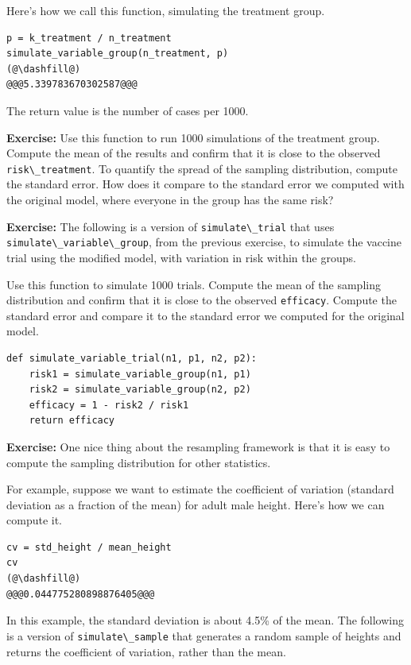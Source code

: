 Here's how we call this function, simulating the treatment group.

\begin{lstlisting}[]
p = k_treatment / n_treatment
simulate_variable_group(n_treatment, p)
(@\dashfill@)
@@@5.339783670302587@@@
\end{lstlisting}

The return value is the number of cases per 1000.

\textbf{Exercise:} Use this function to run 1000 simulations of the
treatment group. Compute the mean of the results and confirm that it is
close to the observed \passthrough{\lstinline!risk\_treatment!}. To
quantify the spread of the sampling distribution, compute the standard
error. How does it compare to the standard error we computed with the
original model, where everyone in the group has the same risk?

\textbf{Exercise:} The following is a version of
\passthrough{\lstinline!simulate\_trial!} that uses
\passthrough{\lstinline!simulate\_variable\_group!}, from the previous
exercise, to simulate the vaccine trial using the modified model, with
variation in risk within the groups.

Use this function to simulate 1000 trials. Compute the mean of the
sampling distribution and confirm that it is close to the observed
\passthrough{\lstinline!efficacy!}. Compute the standard error and
compare it to the standard error we computed for the original model.

\begin{lstlisting}[]
def simulate_variable_trial(n1, p1, n2, p2):
    risk1 = simulate_variable_group(n1, p1)
    risk2 = simulate_variable_group(n2, p2)
    efficacy = 1 - risk2 / risk1
    return efficacy
\end{lstlisting}

\textbf{Exercise:} One nice thing about the resampling framework is that
it is easy to compute the sampling distribution for other statistics.

For example, suppose we want to estimate the coefficient of variation
(standard deviation as a fraction of the mean) for adult male height.
Here's how we can compute it.

\begin{lstlisting}[]
cv = std_height / mean_height
cv
(@\dashfill@)
@@@0.044775280898876405@@@
\end{lstlisting}

In this example, the standard deviation is about 4.5\% of the mean. The
following is a version of \passthrough{\lstinline!simulate\_sample!}
that generates a random sample of heights and returns the coefficient of
variation, rather than the mean.


